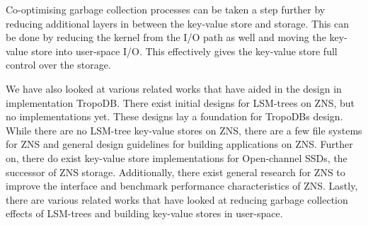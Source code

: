 Co-optimising garbage collection processes can be taken a step further by reducing additional layers in between the key-value store and storage. This can be done by reducing the kernel from the I/O path as well and moving the key-value store into user-space I/O. This effectively gives the key-value store full control over the storage.

We have also looked at various related works that have aided in the design in implementation TropoDB. There exist initial designs for LSM-trees on ZNS, but no implementations yet. These designs lay a foundation for TropoDBs design. While there are no LSM-tree key-value stores on ZNS, there are a few file systems for ZNS and general design guidelines for building applications on ZNS. Further on, there do exist key-value store implementations for Open-channel SSDs, the successor of ZNS storage. Additionally, there exist general research for ZNS to improve the interface and benchmark performance characteristics of ZNS. Lastly, there are various related works that have looked at reducing garbage collection effects of LSM-trees and building key-value stores in user-space.